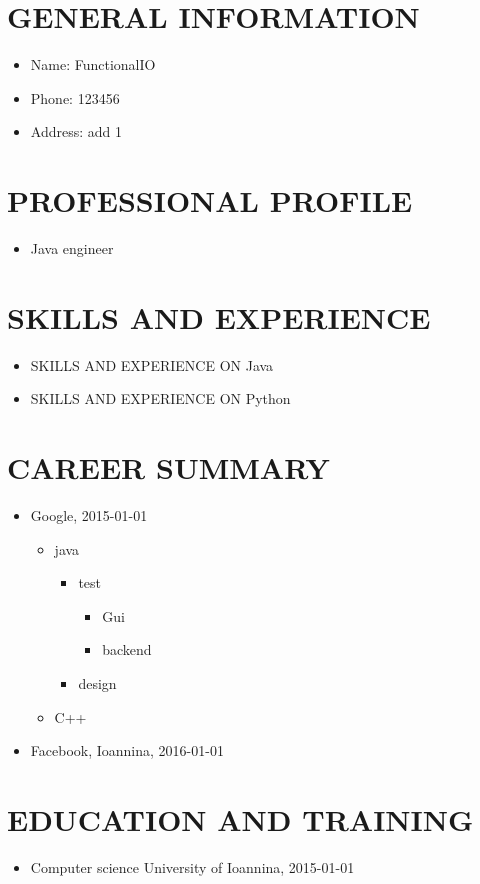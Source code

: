 \documentclass{article}
\begin{document}
 
\section{GENERAL INFORMATION}
\begin{itemize}
\item Name: FunctionalIO
\item Phone: 123456
\item Address: add 1
\end{itemize}
\section{PROFESSIONAL PROFILE}
\begin{itemize}
\item Java engineer
\end{itemize}
\section{SKILLS AND EXPERIENCE}
\begin{itemize}
\item SKILLS AND EXPERIENCE ON Java
\item SKILLS AND EXPERIENCE ON Python
\end{itemize}
\section{CAREER SUMMARY}
\begin{itemize}
\item Google, 2015-01-01
\begin{itemize}
\item java
\begin{itemize}
\item test
\begin{itemize}
\item Gui
\item backend
\end{itemize}
\item design
\end{itemize}
\item C++
\end{itemize}
\item Facebook, Ioannina, 2016-01-01
\end{itemize}
\section{EDUCATION AND TRAINING}
\begin{itemize}
\item Computer science University of Ioannina, 2015-01-01
\end{itemize}
\end{document}
